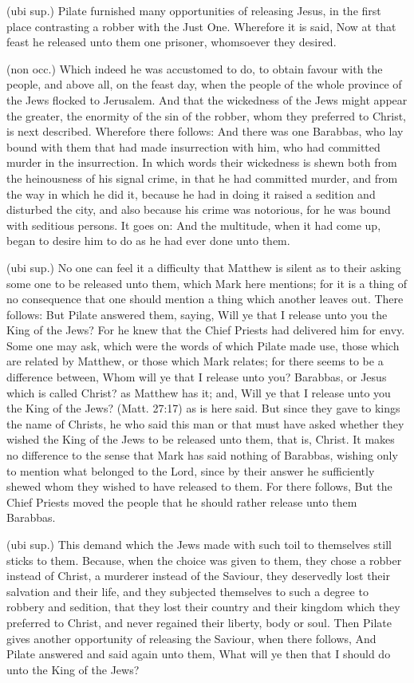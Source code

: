  (ubi sup.) Pilate furnished many opportunities of releasing Jesus, in the first place contrasting a robber with the Just One. Wherefore it is said, Now at that feast he released unto them one prisoner, whomsoever they desired.

 (non occ.) Which indeed he was accustomed to do, to obtain favour with the people, and above all, on the feast day, when the people of the whole province of the Jews flocked to Jerusalem. And that the wickedness of the Jews might appear the greater, the enormity of the sin of the robber, whom they preferred to Christ, is next described. Wherefore there follows: And there was one Barabbas, who lay bound with them that had made insurrection with him, who had committed murder in the insurrection. In which words their wickedness is shewn both from the heinousness of his signal crime, in that he had committed murder, and from the way in which he did it, because he had in doing it raised a sedition and disturbed the city, and also because his crime was notorious, for he was bound with seditious persons. It goes on: And the multitude, when it had come up, began to desire him to do as he had ever done unto them.

 (ubi sup.) No one can feel it a difficulty that Matthew is silent as to their asking some one to be released unto them, which Mark here mentions; for it is a thing of no consequence that one should mention a thing which another leaves out. There follows: But Pilate answered them, saying, Will ye that I release unto you the King of the Jews? For he knew that the Chief Priests had delivered him for envy. Some one may ask, which were the words of which Pilate made use, those which are related by Matthew, or those which Mark relates; for there seems to be a difference between, Whom will ye that I release unto you? Barabbas, or Jesus which is called Christ? as Matthew has it; and, Will ye that I release unto you the King of the Jews? (Matt. 27:17) as is here said. But since they gave to kings the name of Christs, he who said this man or that must have asked whether they wished the King of the Jews to be released unto them, that is, Christ. It makes no difference to the sense that Mark has said nothing of Barabbas, wishing only to mention what belonged to the Lord, since by their answer he sufficiently shewed whom they wished to have released to them. For there follows, But the Chief Priests moved the people that he should rather release unto them Barabbas.

 (ubi sup.) This demand which the Jews made with such toil to themselves still sticks to them. Because, when the choice was given to them, they chose a robber instead of Christ, a murderer instead of the Saviour, they deservedly lost their salvation and their life, and they subjected themselves to such a degree to robbery and sedition, that they lost their country and their kingdom which they preferred to Christ, and never regained their liberty, body or soul. Then Pilate gives another opportunity of releasing the Saviour, when there follows, And Pilate answered and said again unto them, What will ye then that I should do unto the King of the Jews?

